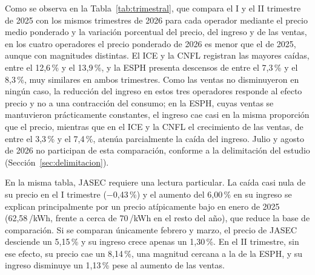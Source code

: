 \documentclass[conference]{IEEEtran}
\newcommand{\crc}{\textcolonmonetary} %
\begin{document}
Como se observa en la Tabla~\ref{tab:trimestral}, que compara el I y el II trimestre de 2025 con los mismos trimestres de 2026 para cada operador mediante el precio medio ponderado y la variaci\'on porcentual del precio, del ingreso y de las ventas, en los cuatro operadores el precio ponderado de 2026 es menor que el de 2025, aunque con magnitudes distintas. El ICE y la CNFL registran las mayores ca\'idas, entre el 12,6\,\% y el 13,9\,\%, y la ESPH presenta descensos de entre el 7,3\,\% y el 8,3\,\%, muy similares en ambos trimestres. Como las ventas no disminuyeron en ning\'un caso, la reducci\'on del ingreso en estos tres operadores responde al efecto precio y no a una contracci\'on del consumo; en la ESPH, cuyas ventas se mantuvieron pr\'acticamente constantes, el ingreso cae casi en la misma proporci\'on que el precio, mientras que en el ICE y la CNFL el crecimiento de las ventas, de entre el 3,3\,\% y el 7,4\,\%, aten\'ua parcialmente la ca\'ida del ingreso. Julio y agosto de 2026 no participan de esta comparaci\'on, conforme a la delimitaci\'on del estudio (Secci\'on~\ref{sec:delimitacion}).

En la misma tabla, JASEC requiere una lectura particular. La ca\'ida casi nula de su precio en el I trimestre ($-$0,43\,\%) y el aumento del 6,00\,\% en su ingreso se explican principalmente por un precio at\'ipicamente bajo en enero de 2025 (62,58\,\crc/kWh, frente a cerca de 70\,\crc/kWh en el resto del a\~no), que reduce la base de comparaci\'on. Si se comparan \'unicamente febrero y marzo, el precio de JASEC desciende un 5,15\,\% y su ingreso crece apenas un 1,30\,\%. En el II trimestre, sin ese efecto, su precio cae un 8,14\,\%, una magnitud cercana a la de la ESPH, y su ingreso disminuye un 1,13\,\% pese al aumento de las ventas.
\end{document}
